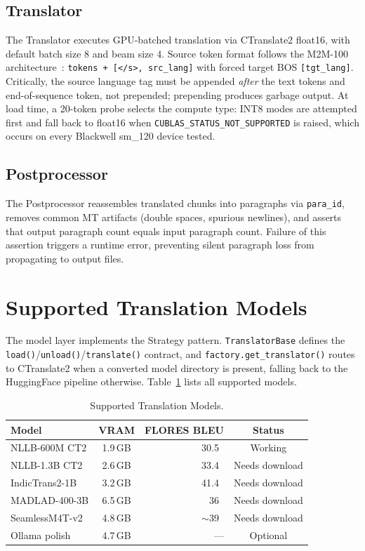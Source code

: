 \documentclass[sigconf]{acmart}
\newcommand{\MADLADBLEU}{36}
\newcommand{\SEAMLESSBLEU}{39}
\begin{document}
\subsection{Translator}

The Translator executes GPU-batched translation via CTranslate2 float16, with
default batch size 8 and beam size 4.
Source token format follows the M2M-100 architecture~\cite{fan2021beyond}:
\texttt{tokens + [</s>, src\_lang]} with forced target BOS \texttt{[tgt\_lang]}.
Critically, the source language tag must be appended \textit{after} the text
tokens and end-of-sequence token, not prepended; prepending produces garbage
output.
At load time, a 20-token probe selects the compute type: INT8 modes are attempted
first and fall back to float16 when \texttt{CUBLAS\_STATUS\_NOT\_SUPPORTED} is
raised, which occurs on every Blackwell sm\_120 device tested.

\subsection{Postprocessor}

The Postprocessor reassembles translated chunks into paragraphs via
\texttt{para\_id}, removes common MT artifacts (double spaces, spurious newlines),
and asserts that output paragraph count equals input paragraph count.
Failure of this assertion triggers a runtime error, preventing silent paragraph
loss from propagating to output files.

\section{Supported Translation Models}

The model layer implements the Strategy pattern.
\texttt{TranslatorBase} defines the \texttt{load()}/\texttt{unload()}/\texttt{translate()}
contract, and \texttt{factory.get\_translator()} routes to CTranslate2 when a
converted model directory is present, falling back to the HuggingFace pipeline
otherwise.
Table~\ref{tab:models} lists all supported models.

\begin{table}[htbp]
\caption{Supported Translation Models.}
\label{tab:models}
\centering
\begin{tabular}{p{2.6cm} c r c}
\toprule
Model & VRAM & FLORES BLEU & Status \\
\midrule
NLLB-600M CT2 & 1.9\,GB & 30.5~\cite{nllb2022} & Working \\
NLLB-1.3B CT2 & 2.6\,GB & 33.4~\cite{nllb2022} & Needs download \\
IndicTrans2-1B & 3.2\,GB & 41.4~\cite{gala2023indictrans2} & Needs download \\
MADLAD-400-3B & 6.5\,GB & \MADLADBLEU~\cite{kudugunta2023madlad} & Needs download \\
SeamlessM4T-v2 & 4.8\,GB & $\sim$\SEAMLESSBLEU~\cite{seamlessm4t2023} & Needs download \\
Ollama polish & 4.7\,GB & --- & Optional \\
\bottomrule
\end{tabular}
\end{table}
\end{document}
